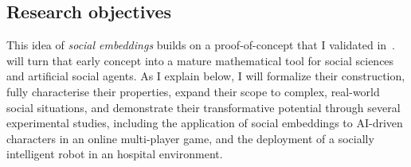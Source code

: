 

%
%

\subsection{Research objectives}


This idea of \emph{social embeddings} builds on a proof-of-concept that I
validated in~\cite{lemaignan2024social}. \project will turn that early concept
into a mature mathematical tool for social sciences and artificial social
agents. As I explain below, I will formalize their construction,  fully
characterise their properties, expand their scope to complex, real-world social
situations, and demonstrate their transformative potential through several
experimental studies, including the application of social embeddings to
AI-driven characters in an online multi-player game, and the deployment of a
socially intelligent robot in an hospital environment.

